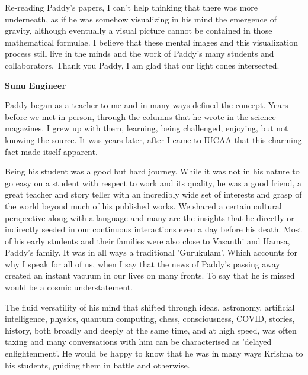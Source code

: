 \documentclass[prd, preprint, longbibliography, 12pt]{revtex4-2}
\begin{document}
Re-reading Paddy's papers, I can't help thinking that there was more 
underneath, as if he was somehow visualizing in his mind the emergence of 
gravity, although eventually a visual picture cannot be contained in those 
mathematical formulae.  I believe that these mental images and this 
visualization process still live in the minds and the work of Paddy's many 
students and collaborators. Thank you Paddy, I am glad that our light 
cones intersected.

\bigskip

\bigskip

\centerline{{\bf Sunu Engineer} }
\medskip
\noindent Paddy began as a teacher to me and in many ways defined the concept. Years before we met in person, through the columns that he wrote in the science magazines. I grew up with them, learning, being challenged, enjoying, but not knowing the source. It was years later, after I came to IUCAA that this charming fact made itself apparent. 
\par 
Being his student was a good but hard journey. While it  was not in his nature to go easy on a student with respect to work and its quality, he was a good friend, a great teacher and story teller with an incredibly wide set of interests and grasp of the world beyond much of his published works. We shared a certain cultural perspective along with a language and many are the insights that he directly or indirectly seeded in our continuous interactions even a day before his death. Most of his  early students and their families  were also close to Vasanthi and Hamsa, Paddy's family. It was in all ways a traditional 'Gurukulam'. Which accounts for why I speak for all of us, when I say that the news of Paddy's passing away created an instant vacuum in our lives on many fronts. To say that he is missed would be a cosmic understatement.
\par
The fluid versatility of his mind that shifted through ideas,  astronomy, artificial intelligence, physics, quantum computing, chess, consciousness, COVID, stories, history, both broadly and deeply at the same time, and at high speed, was often taxing and many conversations with him can be characterised as 'delayed enlightenment'. He would be happy to know that he was in many ways Krishna to his students, guiding them in battle and otherwise.


\bigskip

\bigskip
\end{document}

